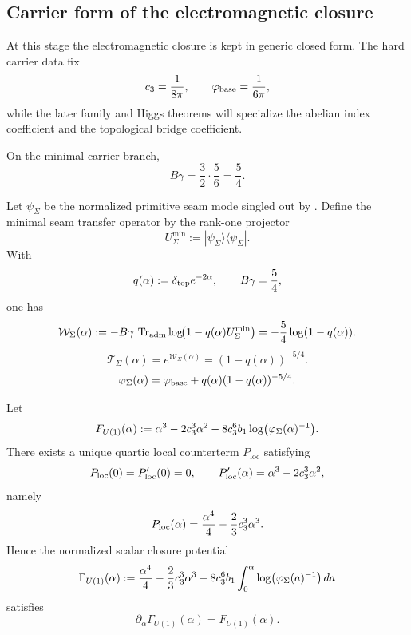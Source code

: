 \subsection{Carrier form of the electromagnetic closure}

At this stage the electromagnetic closure is kept in generic closed form. The hard carrier data
fix
\[
c_3=\frac{1}{8\pi},
\qquad
\varphi_{\mathrm{base}}=\frac{1}{6\pi},
\]
while the later family and Higgs theorems will specialize the abelian index coefficient and the
topological bridge coefficient.

\begin{proposition}
\label{prop:carrier-susceptibility-exponent}
On the minimal carrier branch,
\[
B\gamma=\frac32\cdot\frac56=\frac54.
\]
\end{proposition}
\begin{definition}
\label{def:exact-seam-generating-function}
Let $\psi_{\Sigma}$ be the normalized primitive seam mode singled out by
. Define the minimal seam transfer operator by the rank-one
projector
\[
U_{\Sigma}^{\min}:=|\psi_{\Sigma}\rangle\langle\psi_{\Sigma}|.
\]
With
\[
q(\alpha):=\delta_{\mathrm{top}} e^{-2\alpha},
\qquad
B\gamma=\frac54,
\]
one has
\[
\mathcal W_{\Sigma}(\alpha)
:=
-B\gamma\,\operatorname{Tr}_{\mathrm{adm}}\log\!\bigl(1-q(\alpha)U_{\Sigma}^{\min}\bigr)
=-\frac54\log(1-q(\alpha)).
\]
\[
\mathcal T_{\Sigma}(\alpha)=e^{\mathcal W_{\Sigma}(\alpha)}=(1-q(\alpha))^{-5/4}.
\]
\begin{equation}
\label{eq:phi-opening}
\varphi_{\Sigma}(\alpha)=\varphi_{\mathrm{base}}+q(\alpha)(1-q(\alpha))^{-5/4}.
\end{equation}
\end{definition}

\begin{proposition}
\label{prop:log-det-variation-u1}
Let
\[
F_{U(1)}(\alpha):=\alpha^3-2c_3^3\alpha^2-8c_3^6 b_1\log\bigl(\varphi_{\Sigma}(\alpha)^{-1}\bigr).
\]
There exists a unique quartic local counterterm $P_{\mathrm{loc}}$ satisfying
\[
P_{\mathrm{loc}}(0)=P_{\mathrm{loc}}'(0)=0,
\qquad
P_{\mathrm{loc}}'(\alpha)=\alpha^3-2c_3^3\alpha^2,
\]
namely
\[
P_{\mathrm{loc}}(\alpha)=\frac{\alpha^4}{4}-\frac23c_3^3\alpha^3.
\]
Hence the normalized scalar closure potential
\[
\Gamma_{U(1)}(\alpha)
:=
\frac{\alpha^4}{4}-\frac23c_3^3\alpha^3
-8c_3^6 b_1\int_0^\alpha \log\bigl(\varphi_{\Sigma}(a)^{-1}\bigr)\,da
\]
satisfies
\[
\partial_{\alpha}\Gamma_{U(1)}(\alpha)=F_{U(1)}(\alpha).
\]
\end{proposition}



